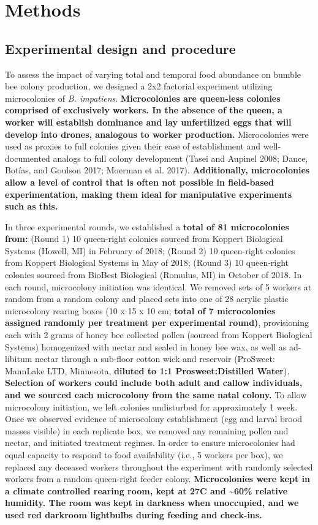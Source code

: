 \documentclass[11pt,]{article}
\begin{document}
\hypertarget{methods}{%
\section{Methods}\label{methods}}

\hypertarget{experimental-design-and-procedure}{%
\subsection{Experimental design and
procedure}\label{experimental-design-and-procedure}}

To assess the impact of varying total and temporal food abundance on
bumble bee colony production, we designed a 2x2 factorial experiment
utilizing microcolonies of \emph{B. impatiens}. \textbf{Microcolonies
are queen-less colonies comprised of exclusively workers. In the absence
of the queen, a worker will establish dominance and lay unfertilized
eggs that will develop into drones, analogous to worker production.}
Microcolonies were used as proxies to full colonies given their ease of
establishment and well-documented analogs to full colony development
(Tasei and Aupinel 2008; Dance, Botías, and Goulson 2017; Moerman et al.
2017). \textbf{Additionally, microcolonies allow a level of control that
is often not possible in field-based experimentation, making them ideal
for manipulative experiments such as this.}

In three experimental rounds, we established a \textbf{total of 81
microcolonies from:} (Round 1) 10 queen-right colonies sourced from
Koppert Biological Systems (Howell, MI) in February of 2018; (Round 2)
10 queen-right colonies from Koppert Biological Systems in May of 2018;
(Round 3) 10 queen-right colonies sourced from BioBest Biological
(Romulus, MI) in October of 2018. In each round, microcolony initiation
was identical. We removed sets of 5 workers at random from a random
colony and placed sets into one of 28 acrylic plastic microcolony
rearing boxes (10 x 15 x 10 cm; \textbf{total of 7 microcolonies
assigned randomly per treatment per experimental round)}, provisioning
each with 2 grams of honey bee collected pollen (sourced from Koppert
Biological Systems) homogenized with nectar and sealed in honey bee wax,
as well as ad-libitum nectar through a sub-floor cotton wick and
reservoir (ProSweet: MannLake LTD, Minnesota, \textbf{diluted to 1:1
Prosweet:Distilled Water}). \textbf{Selection of workers could include
both adult and callow individuals, and we sourced each microcolony from
the same natal colony.} To allow microcolony initiation, we left
colonies undisturbed for approximately 1 week. Once we observed evidence
of microcolony establishment (egg and larval brood masses visible) in
each replicate box, we removed any remaining pollen and nectar, and
initiated treatment regimes. In order to ensure microcolonies had equal
capacity to respond to food availability (i.e., 5 workers per box), we
replaced any deceased workers throughout the experiment with randomly
selected workers from a random queen-right feeder colony.
\textbf{Microcolonies were kept in a climate controlled rearing room,
kept at 27C and \textasciitilde{}60\% relative humidity. The room was
kept in darkness when unoccupied, and we used red darkroom lightbulbs
during feeding and check-ins.}
\end{document}
